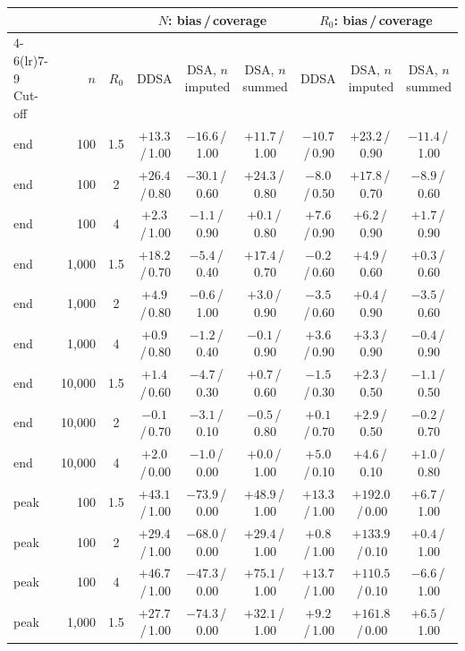 \begin{tabular}{l r c c c c c c c}
\toprule
& & & \multicolumn{3}{c}{$N$: bias\,/\,coverage} & \multicolumn{3}{c}{$R_0$: bias\,/\,coverage} \\
\cmidrule(lr){4-6}\cmidrule(lr){7-9}
Cut-off & $n$ & $R_0$ & DDSA & DSA, $n$ imputed & DSA, $n$ summed & DDSA & DSA, $n$ imputed & DSA, $n$ summed \\
\midrule
end & 100 & 1.5 & ${+}13.3$\,/\,1.00 & $-16.6$\,/\,1.00 & ${+}11.7$\,/\,1.00 & $-10.7$\,/\,0.90 & ${+}23.2$\,/\,0.90 & $-11.4$\,/\,1.00 \\
end & 100 & 2 & ${+}26.4$\,/\,0.80 & $-30.1$\,/\,0.60 & ${+}24.3$\,/\,0.80 & $-8.0$\,/\,0.50 & ${+}17.8$\,/\,0.70 & $-8.9$\,/\,0.60 \\
end & 100 & 4 & ${+}2.3$\,/\,1.00 & $-1.1$\,/\,0.90 & ${+}0.1$\,/\,0.80 & ${+}7.6$\,/\,0.90 & ${+}6.2$\,/\,0.90 & ${+}1.7$\,/\,0.90 \\
end & 1{,}000 & 1.5 & ${+}18.2$\,/\,0.70 & $-5.4$\,/\,0.40 & ${+}17.4$\,/\,0.70 & $-0.2$\,/\,0.60 & ${+}4.9$\,/\,0.60 & ${+}0.3$\,/\,0.60 \\
end & 1{,}000 & 2 & ${+}4.9$\,/\,0.80 & $-0.6$\,/\,1.00 & ${+}3.0$\,/\,0.90 & $-3.5$\,/\,0.60 & ${+}0.4$\,/\,0.90 & $-3.5$\,/\,0.60 \\
end & 1{,}000 & 4 & ${+}0.9$\,/\,0.80 & $-1.2$\,/\,0.40 & $-0.1$\,/\,0.90 & ${+}3.6$\,/\,0.90 & ${+}3.3$\,/\,0.90 & $-0.4$\,/\,0.90 \\
end & 10{,}000 & 1.5 & ${+}1.4$\,/\,0.60 & $-4.7$\,/\,0.30 & ${+}0.7$\,/\,0.60 & $-1.5$\,/\,0.30 & ${+}2.3$\,/\,0.50 & $-1.1$\,/\,0.50 \\
end & 10{,}000 & 2 & $-0.1$\,/\,0.70 & $-3.1$\,/\,0.10 & $-0.5$\,/\,0.80 & ${+}0.1$\,/\,0.70 & ${+}2.9$\,/\,0.50 & $-0.2$\,/\,0.70 \\
end & 10{,}000 & 4 & ${+}2.0$\,/\,0.00 & $-1.0$\,/\,0.00 & ${+}0.0$\,/\,1.00 & ${+}5.0$\,/\,0.10 & ${+}4.6$\,/\,0.10 & ${+}1.0$\,/\,0.80 \\
\midrule
peak & 100 & 1.5 & ${+}43.1$\,/\,1.00 & $-73.9$\,/\,0.00 & ${+}48.9$\,/\,1.00 & ${+}13.3$\,/\,1.00 & ${+}192.0$\,/\,0.00 & ${+}6.7$\,/\,1.00 \\
peak & 100 & 2 & ${+}29.4$\,/\,1.00 & $-68.0$\,/\,0.00 & ${+}29.4$\,/\,1.00 & ${+}0.8$\,/\,1.00 & ${+}133.9$\,/\,0.10 & ${+}0.4$\,/\,1.00 \\
peak & 100 & 4 & ${+}46.7$\,/\,1.00 & $-47.3$\,/\,0.00 & ${+}75.1$\,/\,1.00 & ${+}13.7$\,/\,1.00 & ${+}110.5$\,/\,0.10 & $-6.6$\,/\,1.00 \\
peak & 1{,}000 & 1.5 & ${+}27.7$\,/\,1.00 & $-74.3$\,/\,0.00 & ${+}32.1$\,/\,1.00 & ${+}9.2$\,/\,1.00 & ${+}161.8$\,/\,0.00 & ${+}6.5$\,/\,1.00 \\

\end{tabular}
